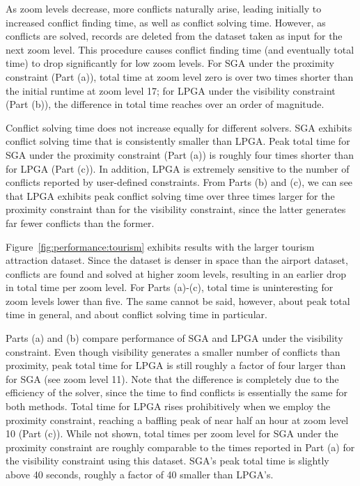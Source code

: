 \documentclass[11pt, oneside]{report}
\begin{document}
As zoom levels decrease, more conflicts naturally arise, leading initially to increased conflict finding time, as well as conflict solving time. However, as conflicts are solved, records are deleted from the dataset taken as input for the next zoom level. This procedure causes conflict finding time (and eventually total time) to drop significantly for low zoom levels. For SGA under the proximity constraint (Part (a)), total time at zoom level zero is over two times shorter than the initial runtime at zoom level 17; for LPGA under the visibility constraint (Part (b)), the difference in total time reaches over an order of magnitude.  

Conflict solving time does not increase equally for different solvers. SGA exhibits conflict solving time that is consistently smaller than LPGA. Peak total time for SGA under the proximity constraint (Part (a)) is roughly four times shorter than for LPGA (Part (c)). In addition, LPGA is extremely sensitive to the number of conflicts reported by user-defined constraints. From Parts (b) and (c), we can see that LPGA exhibits peak conflict solving time over three times larger for the proximity constraint than for the visibility constraint, since the latter generates far fewer conflicts than the former.

Figure~\ref{fig:performance:tourism} exhibits results with the larger tourism attraction dataset. Since the dataset is denser in space than the airport dataset, conflicts are found and solved at higher zoom levels, resulting in an earlier drop in total time per zoom level. For Parts (a)-(c), total time is uninteresting for zoom levels lower than five. The same cannot be said, however, about peak total time in general, and about conflict solving time in particular.

Parts (a) and (b) compare performance of SGA and LPGA under the visibility constraint. Even though visibility generates a smaller number of conflicts than proximity, peak total time for LPGA is still roughly a factor of four larger than for SGA (see zoom level 11). Note that the difference is completely due to the efficiency of the solver, since the time to find conflicts is essentially the same for both methods. Total time for LPGA rises prohibitively when we employ the proximity constraint, reaching a baffling peak of near half an hour at zoom level 10 (Part (c)). While not shown, total times per zoom level for SGA under the proximity constraint are roughly comparable to the times reported in Part (a) for the visibility constraint using this dataset. SGA's peak total time is slightly above 40 seconds, roughly a factor of 40 smaller than LPGA's.         
\end{document}
